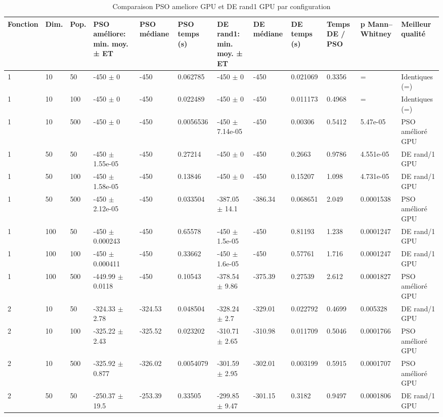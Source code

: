 \begin{table}[t]
\centering
\caption{Comparaison PSO ameliore GPU et DE rand1 GPU par configuration}
\label{tab:pso-vs-de-gpu}
\scriptsize
\begin{tabular}{llllllllllll}
\toprule
Fonction & Dim. & Pop. & PSO améliore: min. moy. ± ET & PSO médiane & PSO temps (s) & DE rand1: min. moy. ± ET & DE médiane & DE temps (s) & Temps DE / PSO & p Mann–Whitney & Meilleur qualité \\
\midrule
1 & 10 & 50 & -450 $\pm$ 0 & -450 & 0.062785 & -450 $\pm$ 0 & -450 & 0.021069 & 0.3356 & = & Identiques (=) \\
1 & 10 & 100 & -450 $\pm$ 0 & -450 & 0.022489 & -450 $\pm$ 0 & -450 & 0.011173 & 0.4968 & = & Identiques (=) \\
1 & 10 & 500 & -450 $\pm$ 0 & -450 & 0.0056536 & -450 $\pm$ 7.14e-05 & -450 & 0.00306 & 0.5412 & 5.47e-05 & PSO amélioré GPU \\
1 & 50 & 50 & -450 $\pm$ 1.55e-05 & -450 & 0.27214 & -450 $\pm$ 0 & -450 & 0.2663 & 0.9786 & 4.551e-05 & DE rand/1 GPU \\
1 & 50 & 100 & -450 $\pm$ 1.58e-05 & -450 & 0.13846 & -450 $\pm$ 0 & -450 & 0.15207 & 1.098 & 4.731e-05 & DE rand/1 GPU \\
1 & 50 & 500 & -450 $\pm$ 2.12e-05 & -450 & 0.033504 & -387.05 $\pm$ 14.1 & -386.34 & 0.068651 & 2.049 & 0.0001538 & PSO amélioré GPU \\
1 & 100 & 50 & -450 $\pm$ 0.000243 & -450 & 0.65578 & -450 $\pm$ 1.5e-05 & -450 & 0.81193 & 1.238 & 0.0001247 & DE rand/1 GPU \\
1 & 100 & 100 & -450 $\pm$ 0.000411 & -450 & 0.33662 & -450 $\pm$ 1.6e-05 & -450 & 0.57761 & 1.716 & 0.0001247 & DE rand/1 GPU \\
1 & 100 & 500 & -449.99 $\pm$ 0.0118 & -450 & 0.10543 & -378.54 $\pm$ 9.86 & -375.39 & 0.27539 & 2.612 & 0.0001827 & PSO amélioré GPU \\
2 & 10 & 50 & -324.33 $\pm$ 2.78 & -324.53 & 0.048504 & -328.24 $\pm$ 2.7 & -329.01 & 0.022792 & 0.4699 & 0.005328 & DE rand/1 GPU \\
2 & 10 & 100 & -325.22 $\pm$ 2.43 & -325.52 & 0.023202 & -310.71 $\pm$ 2.65 & -310.98 & 0.011709 & 0.5046 & 0.0001766 & PSO amélioré GPU \\
2 & 10 & 500 & -325.92 $\pm$ 0.877 & -326.02 & 0.0054079 & -301.59 $\pm$ 2.95 & -302.01 & 0.003199 & 0.5915 & 0.0001707 & PSO amélioré GPU \\
2 & 50 & 50 & -250.37 $\pm$ 19.5 & -253.39 & 0.33505 & -299.85 $\pm$ 9.47 & -301.15 & 0.3182 & 0.9497 & 0.0001806 & DE rand/1 GPU \\

\end{tabular}
\end{table}
